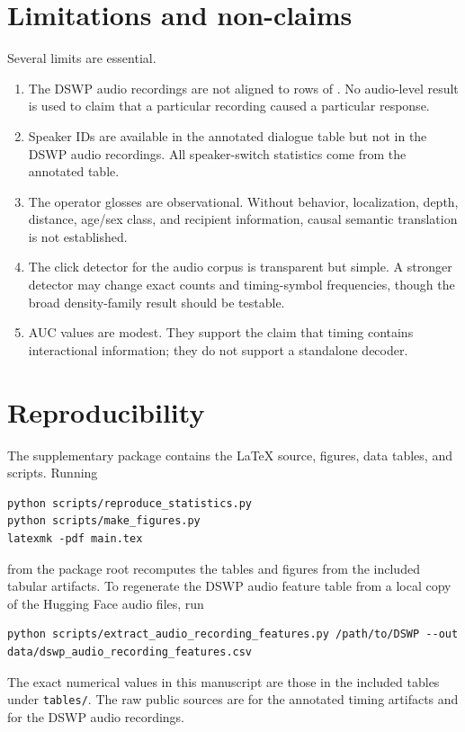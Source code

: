 \documentclass[11pt]{article}
\begin{document}
\section{Limitations and non-claims}

Several limits are essential.

\begin{enumerate}
    \item The DSWP audio recordings are not aligned to rows of . No audio-level result is used to claim that a particular recording caused a particular response.
    \item Speaker IDs are available in the annotated dialogue table but not in the DSWP audio recordings. All speaker-switch statistics come from the annotated table.
    \item The operator glosses are observational. Without behavior, localization, depth, distance, age/sex class, and recipient information, causal semantic translation is not established.
    \item The click detector for the audio corpus is transparent but simple. A stronger detector may change exact counts and timing-symbol frequencies, though the broad density-family result should be testable.
    \item AUC values are modest. They support the claim that timing contains interactional information; they do not support a standalone decoder.
\end{enumerate}

\section{Reproducibility}

The supplementary package contains the LaTeX source, figures, data tables, and scripts. Running
\begin{lstlisting}
python scripts/reproduce_statistics.py
python scripts/make_figures.py
latexmk -pdf main.tex
\end{lstlisting}
from the package root recomputes the tables and figures from the included tabular artifacts. To regenerate the DSWP audio feature table from a local copy of the Hugging Face audio files, run
\begin{lstlisting}
python scripts/extract_audio_recording_features.py /path/to/DSWP --out data/dswp_audio_recording_features.csv
\end{lstlisting}
The exact numerical values in this manuscript are those in the included tables under \texttt{tables/}. The raw public sources are  for the annotated timing artifacts and  for the DSWP audio recordings.
\end{document}
